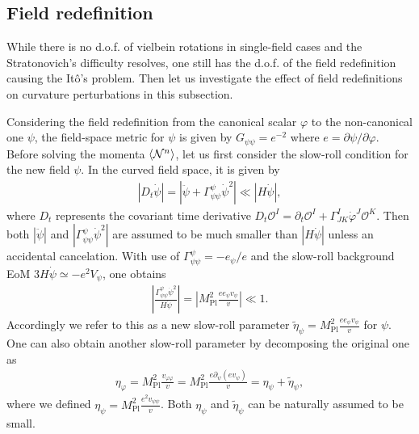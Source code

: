 \documentclass[aps, prd
, preprint
, nofootinbib 
, superscriptaddress
, longbibliography
]{revtex4-1}
\newcommand{\Mpl}{M_\text{Pl}}
\newcommand{\calN}{\mathcal{N}}
\newcommand{\calO}{\mathcal{O}}
\newcommand{\bae}[1]{\begin{align} #1 \end{align}}
\begin{document}
\subsection{Field redefinition}\label{sec: field redefinition}

While there is no d.o.f. of vielbein rotations in single-field cases and the Stratonovich's difficulty resolves, 
one still has the d.o.f. of the field redefinition causing the It\^o's problem. Then let us investigate the effect of field redefinitions on curvature perturbations in this subsection.

Considering the field redefinition from the canonical scalar $\varphi$ to the non-canonical one $\psi$, the field-space metric for $\psi$ 
is given by $G_{\psi\psi}=e^{-2}$ where $e=\partial\psi/\partial\varphi$.
Before solving the momenta $\braket{\calN^n}$, let us first consider the slow-roll condition for the new field $\psi$.
In the curved field space, it is given by
\bae{
	|D_t\dot{\psi}|=|\ddot{\psi}+\Gamma^\psi_{\psi\psi}\dot{\psi}^2|\ll|H\dot{\psi}|,
}
where $D_t$ represents the covariant time derivative $D_t\calO^I=\partial_t\calO^I+\Gamma^I_{JK}\dot{\varphi}^J\calO^K$.
Then both $|\ddot{\psi}|$ and $|\Gamma^\psi_{\psi\psi}\dot{\psi}^2|$ are assumed to be much smaller than $|H\dot{\psi}|$ unless an accidental cancelation.
With use of $\Gamma^\psi_{\psi\psi}=-e_\psi/e$ and the slow-roll background EoM $3H\dot{\psi}\simeq-e^2V_\psi$,
one obtains
\bae{
	\left|\frac{\Gamma^\psi_{\psi\psi}\dot{\psi}^2}{H\dot{\psi}}\right|=\left|\Mpl^2\frac{ee_\psi v_\psi}{v}\right|\ll1.
}
Accordingly we refer to this as a new slow-roll parameter $\tilde{\eta}_\psi=\Mpl^2\frac{ee_\psi v_\psi}{v}$ for $\psi$.
One can also obtain another slow-roll parameter by decomposing the original one as
\bae{
	\eta_{\varphi}=\Mpl^2\frac{v_{\varphi\varphi}}{v}=\Mpl^2\frac{e\partial_\psi(ev_\psi)}{v}=\eta_\psi+\tilde{\eta}_\psi,
}
where we defined $\eta_\psi=\Mpl^2\frac{e^2v_{\psi\psi}}{v}$. 
Both $\eta_\psi$ and $\tilde{\eta}_\psi$ can be naturally assumed to be small.
\end{document}
